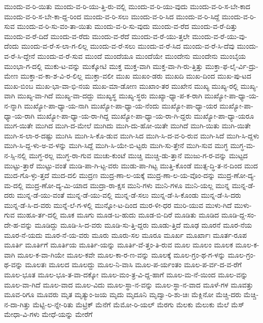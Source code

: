 {ಮುಂದು-ವ-ರಿ-ಯಿತು
ಮುಂದು-ವ-ರಿ-ಯು-ತ್ತಿ-ರು-ವಲ್ಲಿ
ಮುಂದು-ವ-ರಿ-ಯು-ವುದು
ಮುಂದು-ವ-ರಿ-ಸ-ಬೇ-ಕಾದ
ಮುಂದು-ವ-ರಿ-ಸ-ಬೇ-ಕಾ-ದ್ದ-ರಿಂದ
ಮುಂದು-ವ-ರಿ-ಸಲು
ಮುಂದು-ವ-ರಿ-ಸಿದ
ಮುಂದು-ವ-ರಿ-ಸಿದ್ದೆ
ಮುಂದು-ವ-ರಿ-ಸುವ
ಮುಂದು-ವ-ರಿ-ಸು-ವಂ-ತಾ-ಯಿತು
ಮುಂದು-ವ-ರಿ-ಸು-ವುದು
ಮುಂದು-ವ-ರೆದ
ಮುಂದು-ವ-ರೆ-ದಿತ್ತು
ಮುಂದು-ವ-ರೆ-ದಿದೆ
ಮುಂದು-ವ-ರೆದು
ಮುಂದು-ವ-ರೆದೆ
ಮುಂದು-ವ-ರೆ-ಯು-ತ್ತಲೇ
ಮುಂದು-ವ-ರೆ-ಯು-ವು-ದೆಂದು
ಮುಂದು-ವ-ರೆ-ಸ-ಲಾ-ಗ-ಲಿಲ್ಲ
ಮುಂದು-ವ-ರೆ-ಸಲು
ಮುಂದು-ವ-ರೆ-ಸಿದ
ಮುಂದು-ವ-ರೆ-ಸಿ-ದೆವು
ಮುಂದು-ವ-ರೆ-ಸಿ-ದ್ದೇನೆ
ಮುಂದು-ವ-ರೆ-ಸುವ
ಮುಂದೆ
ಮುಂದೆಯೂ
ಮುಂದೆಯೇ
ಮುಂದೇನು
ಮುಂದೇನು
ಮುಂಬೈಯ
ಮುಂಭಾ-ಗ-ದಲ್ಲಿ
ಮುಕು-ಟ-ವನ್ನು
ಮುಕ್ಕೋಟಿ
ಮುಕ್ತ
ಮುಕ್ತ-ವಾಗಿ
ಮುಕ್ತ-ವಾ-ಗಿ-ರು-ತ್ತಿತ್ತು
ಮುಕ್ತಾ-ಫ-ಲೈ-ರ್ವಿ-ದ್ರು-ಮೇಣ
ಮುಕ್ತಾ-ವ-ಕಾ-ಶ-ವಿ-ರ-ಲಿಲ್ಲ
ಮುಕ್ತಾ-ವಲೀ
ಮುಖ
ಮುಖಂ-ಡರು
ಮುಖದಿ
ಮುಖ-ದಿಂದ
ಮುಖ-ಪು-ಟದ
ಮುಖ-ಬಿಂಬ
ಮುಖ-ಭಾ-ವಾ-ಭಿ-ನಯ
ಮುಖ-ಮಾ-ಡೋಣ
ಮುಖಾಂ-ತರ
ಮುಖೇನ
ಮುಖ್ಯ
ಮುಖ್ಯ-ರಲ್ಲಿ
ಮುಖ್ಯ-ವಾಗಿ
ಮುಖ್ಯ-ವಾ-ಗಿದೆ
ಮುಖ್ಯ-ವಾ-ದದ್ದು
ಮುಖ್ಯಸ್ಥ
ಮುಖ್ಯ-ಸ್ಥರು
ಮುಖ್ಯಾ-ಧ್ಯಾ-ಪ-ಕ-ರಾಗಿ
ಮುಖ್ಯೋ-ಪಾ-ಧ್ಯಾ-ಯ-ನ-ನ್ನಾಗಿ
ಮುಖ್ಯೋ-ಪಾ-ಧ್ಯಾ-ಯ-ನಾಗಿ
ಮುಖ್ಯೋ-ಪಾ-ಧ್ಯಾ-ಯ-ನೆಂದು
ಮುಖ್ಯೋ-ಪಾ-ಧ್ಯಾ-ಯರ
ಮುಖ್ಯೋ-ಪಾ-ಧ್ಯಾ-ಯ-ರಾಗಿ
ಮುಖ್ಯೋ-ಪಾ-ಧ್ಯಾ-ಯ-ರಾ-ಗಿದ್ದ
ಮುಖ್ಯೋ-ಪಾ-ಧ್ಯಾ-ಯ-ರಾ-ಗಿ-ದ್ದರು
ಮುಖ್ಯೋ-ಪಾ-ಧ್ಯಾ-ಯರೂ
ಮುಗ-ಯಿತೇ
ಮುಗಿದ
ಮುಗಿ-ದ-ಮೇಲೆ
ಮುಗಿದು
ಮುಗಿ-ದು-ಹೋ-ಯಿತೇ
ಮುಗಿದೆ
ಮುಗಿ-ಯಿತು
ಮುಗಿ-ಯಿತೇ
ಮುಗಿ-ಸ-ಲಾ-ರ-ದಷ್ಟು
ಮುಗಿಸಿ
ಮುಗಿ-ಸಿ-ಕೊ-ಡುವ
ಮುಗಿ-ಸಿದ
ಮುಗಿ-ಸಿ-ದ-ವ-ರಿ-ರುವ
ಮುಗಿ-ಸಿದೆ
ಮುಗಿ-ಸಿ-ದ್ದಳು
ಮುಗಿ-ಸಿ-ದ್ದ-ಳು-ಅ-ವ-ಳನ್ನು
ಮುಗಿ-ಸಿದ್ದೆ
ಮುಗಿ-ಸಿ-ಯೇ-ಬಿ-ಟ್ಟರು
ಮುಗಿ-ಸು-ತ್ತೇನೆ
ಮುಗಿ-ಸುವ
ಮುಗ್ಧ
ಮುಗ್ಧ-ಮ-ನ-ಸ್ಸಿ-ನಲ್ಲಿ
ಮುಗ್ಧ-ರಲ್ಲ
ಮುಗ್ಧ-ರಾ-ಗುವ
ಮುಚು-ಕುಂಟೆ
ಮುಚ್ಚಿ
ಮುಚ್ಚಿ-ಡು-ತ್ತಾನೆ
ಮುಜು-ಗ-ರ-ವನ್ನು
ಮುಟ್ಟದ
ಮುಟ್ಟು-ತ್ತಾರೆ
ಮುಟ್ಟು-ವಂತೆ
ಮುಡಿ-ಪಾ-ಗಿ-ಟ್ಟ-ವರು
ಮುಡು-ಪಾ-ಗಿಟ್ಟ
ಮುತ್ತಿ-ಕೊಂಡೆ
ಮುತ್ಸ-ದ್ಧಿ-ತ-ನ-ದಿಂದ
ಮುದ
ಮುದ-ಗೊ-ಳ್ಳು-ತ್ತದೆ
ಮುದ-ದಲಿ
ಮುದ್ರಣ
ಮುದ್ರ-ಣಾ-ಲ-ಯಕ್ಕೆ
ಮುದ್ರ-ಣಾ-ಲ-ಯ-ವೊಂ-ದನ್ನು
ಮುದ್ರ-ಣೋ-ದ್ಯ-ಮ-ದಲ್ಲಿ
ಮುದ್ರ-ಣೋ-ದ್ಯ-ಮಿ-ಯಾದ
ಮುದ್ರಾ-ರಾ-ಕ್ಷಸ
ಮುನಿ-ಗಳು
ಮುನಿ-ಗಳೂ
ಮುನಿ-ಯಲ್ಲ
ಮುನ್ನ
ಮುನ್ನ-ಡೆ-ದರು
ಮುನ್ನ-ಡೆ-ಯು-ವಂತೆ
ಮುನ್ನ-ಡೆ-ಯು-ವಲ್ಲಿ
ಮುನ್ನ-ಡೆ-ಸಲು
ಮುನ್ನ-ಡೆ-ಸಿ-ಕೊಂಡು
ಮುನ್ನ-ಡೆ-ಸಿ-ದರು
ಮುನ್ನ-ಡೆ-ಸಿ-ದ-ವರು
ಮುನ್ನೆ-ಲೆ-ಗ-ಳಲ್ಲಿ
ಮುನ್ನೋ-ಟ-ದಿಂದ
ಮುರ-ಳೀ-ಧರ
ಮುರಿ-ಯುವ
ಮುಳು-ಗಿದೆ
ಮುಳು-ಗುವ
ಮುಹೂ-ರ್ತ-ದಲ್ಲಿ
ಮೂಕ
ಮೂಗು
ಮೂಡ-ಬ-ಹುದು
ಮೂಡ-ಬಿ-ದಿರೆ
ಮೂಡಿತು
ಮೂಡಿದ
ಮೂಡಿ-ದ್ದ-ಸಂ-ದೇ-ಹ-ವನ್ನು
ಮೂಡಿದ್ದು
ಮೂಡಿ-ಸಿ-ದ-ವರು
ಮೂಡಿ-ಸು-ತ್ತಿ-ದ್ದರು
ಮೂಡು-ತ್ತಿದೆ
ಮೂಢ
ಮೂರನೆ
ಮೂರ-ನೆಯ
ಮೂರ-ನೆ-ಯದು
ಮೂರ-ನೆ-ಯ-ವರು
ಮೂರು
ಮೂರು-ಸಲ
ಮೂರೂ
ಮೂರ್ಖ
ಮೂರ್ಖಾಃ
ಮೂರ್ತ-ರೂಪ
ಮೂರ್ತಿ
ಮೂರ್ತಿಗೆ
ಮೂರ್ತಿಯ
ಮೂರ್ತಿ-ಯನ್ನು
ಮೂರ್ತಿ-ವೆ-ತ್ತಂ-ತಿ-ರುವ
ಮೂಲ
ಮೂಲಂ
ಮೂಲಕ
ಮೂಲ-ಕ-ವಾಗಿ
ಮೂಲ-ಕ-ವಾ-ಗಿಯೇ
ಮೂಲ-ಕವೇ
ಮೂಲ-ಕಾ-ರ-ಣ-ವನ್ನು
ಮೂಲಕ್ಕೆ
ಮೂಲ-ಗ್ರಂ-ಥ-ಗ-ಳನ್ನು
ಮೂಲ-ಗ್ರಂ-ಥ-ವನ್ನು
ಮೂಲತಃ
ಮೂಲದ
ಮೂಲದ್ದು
ಮೂಲ-ನಿ-ವಾಸಿ
ಮೂಲ-ಪ-ರ್ಯಂತಂ
ಮೂಲ-ಪ-ರ್ವ-ದ-ವ-ರೆಗೆ
ಮೂಲ-ಭೂತ
ಮೂಲ-ಭೂ-ತ-ವಾ-ದಕ್ಕೋ
ಮೂಲ-ಮಂ-ತ್ರ-ವಿ-ದ್ದ-ಹಾಗೆ
ಮೂಲ-ಮ-ನೆ-ಯಿಂದ
ಮೂಲ-ವನ್ನು
ಮೂಲ-ವಾ-ಗಿದೆ
ಮೂಲ-ವಾದ
ಮೂಲ-ವಿದು
ಮೂಲ-ಸ್ಥಾ-ನ-ವನ್ನು
ಮೂಲ-ಸ್ಥಾ-ನ-ವಾದ
ಮೂಳೆ-ಗಳ
ಮೂವತ್ತು
ಮೂವ-ರಿಗೂ
ಮೂವರು
ಮೃತ
ಮೃತ್ಯುಂ-ಜಯ
ಮೃದು
ಮೃದೂನಿ
ಮೃದ್ವಾ-ರಿ-ಶು-ಚಿಃ
ಮೆಕ್ಲಿನೋ
ಮೆಚ್ಚಿ-ದರು
ಮೆಚ್ಚಿ-ನ-ದಾ-ಗಿತ್ತು
ಮೆಟ್ಟಿ-ಲ-ನ್ನೇ-ರಿತು
ಮೆಟ್ರಿಕ್
ಮೆನೆಗೆ
ಮೆಮೋ-ರಿ-ಯಲ್
ಮೆರಗು
ಮೆಲಕು
ಮೆಲುಕು
ಮೆಲೆ
ಮೆಸ್
ಮೇಧಾ-ವಿ-ಗಳು
ಮೇಧೆ-ಯನ್ನು
ಮೇರೆಗೆ
}
